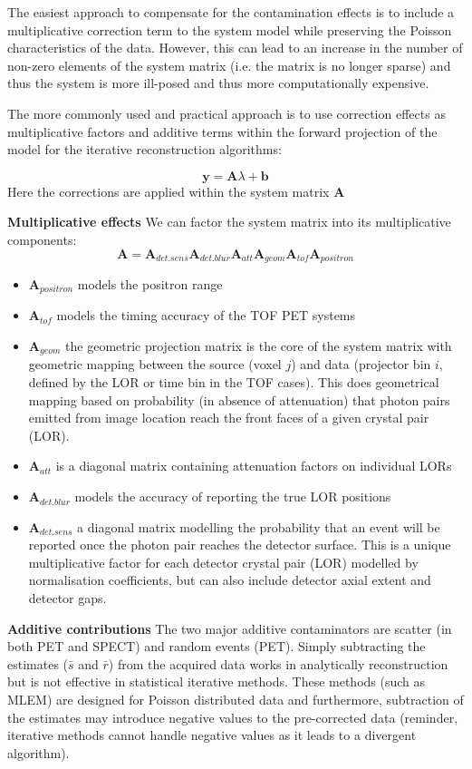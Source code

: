 \documentclass{article}
\begin{document}
The easiest approach to compensate for the contamination effects is to include a multiplicative correction term to the system model while preserving the Poisson characteristics of the data. However, this can lead to an increase in the number of non-zero elements of the system matrix (i.e. the matrix is no longer sparse) and thus the system is more ill-posed and thus more computationally expensive.

The more commonly used and practical approach is to use correction effects as multiplicative factors and additive terms within the forward projection of the model for the iterative reconstruction algorithms:

\begin{equation}
\textbf{y} = \textbf{A}\lambda+\textbf{b}
\end{equation}
Here the corrections are applied within the system matrix $\textbf{A}$  

\textbf{Multiplicative effects}
We can factor the system matrix into its multiplicative components:
\begin{equation}
\textbf{A} = \textbf{A}_{det.sens}\textbf{A}_{det.blur}\textbf{A}_{att}\textbf{A}_{geom}\textbf{A}_{tof}\textbf{A}_{positron}
\end{equation}
\begin{itemize}
\item $\textbf{A}_{positron}$ models the positron range
\item $\textbf{A}_{tof}$ models the timing accuracy of the TOF PET systems
\item $\textbf{A}_{geom}$ the geometric projection matrix is the core of the system matrix with geometric mapping between the source (voxel $j$) and data (projector bin $i$, defined by the LOR or time bin in the TOF cases). This does geometrical mapping based on probability (in absence of attenuation) that photon pairs emitted from image location reach the front faces of a given crystal pair (LOR).
\item $\textbf{A}_{att}$ is a diagonal matrix containing attenuation factors on individual LORs
\item $\textbf{A}_{det.blur}$ models the accuracy of reporting the true LOR positions
\item $\textbf{A}_{det.sens}$ a diagonal matrix modelling the probability that an event will be reported once the photon pair reaches the detector surface. This is a unique multiplicative factor for each detector crystal pair (LOR) modelled by normalisation coefficients, but can also include detector axial extent and detector gaps. 

\end{itemize}
\textbf{Additive contributions}
The two major additive contaminators are scatter (in both PET and SPECT) and random events (PET). Simply subtracting the estimates ($\bar{s}$ and $\bar{r}$) from the acquired data works in analytically reconstruction but is not effective in statistical iterative methods. These methods (such as MLEM) are designed for Poisson distributed data and furthermore, subtraction of the estimates may introduce negative values to the pre-corrected data (reminder, iterative methods cannot handle negative values as it leads to a divergent algorithm). 
\end{document}
